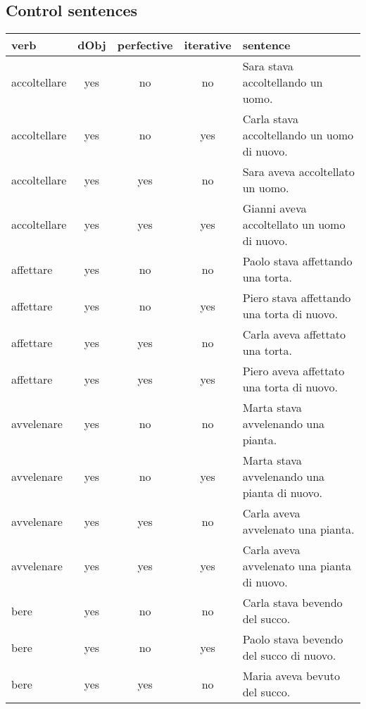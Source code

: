 \subsection{Control sentences}

\begin{longtable}{l|ccc|p{5cm}}
\textbf{verb}     & \textbf{dObj} & \textbf{perfective} & \textbf{iterative}    & \textbf{sentence} \\
\hline
\endhead
accoltellare   & yes  & no         & no        & Sara stava accoltellando un uomo.                   \\
accoltellare   & yes  & no         & yes       & Carla stava accoltellando un uomo di nuovo.         \\
accoltellare   & yes  & yes        & no        & Sara aveva accoltellato un uomo.                    \\
accoltellare   & yes  & yes        & yes       & Gianni aveva accoltellato un uomo di nuovo.         \\
affettare      & yes  & no         & no        & Paolo stava affettando una torta.                   \\
affettare      & yes  & no         & yes       & Piero stava affettando una torta di nuovo.          \\
affettare      & yes  & yes        & no        & Carla aveva affettato una torta.                    \\
affettare      & yes  & yes        & yes       & Piero aveva affettato una torta di nuovo.           \\
avvelenare     & yes  & no         & no        & Marta stava avvelenando una pianta.                 \\
avvelenare     & yes  & no         & yes       & Marta stava avvelenando una pianta di nuovo.        \\
avvelenare     & yes  & yes        & no        & Carla aveva avvelenato una pianta.                  \\
avvelenare     & yes  & yes        & yes       & Carla aveva avvelenato una pianta di nuovo.         \\
bere           & yes  & no         & no        & Carla stava bevendo del succo.                      \\
bere           & yes  & no         & yes       & Paolo stava bevendo del succo di nuovo.             \\
bere           & yes  & yes        & no        & Maria aveva bevuto del succo.                       \\

\end{longtable}
